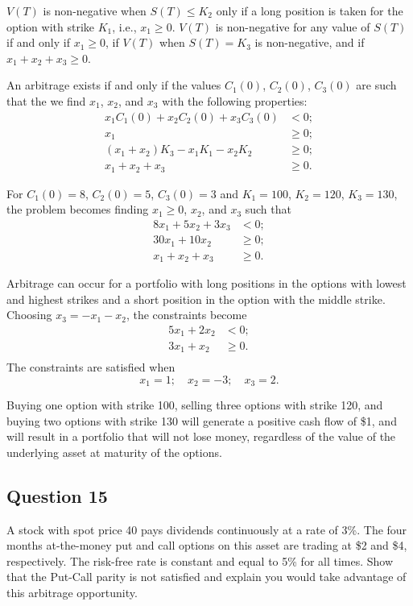$ V(T) $ is non-negative when $ S(T) \leq K_2 $ only if a long position is
    taken for the option with strike $ K_1 $, i.e., $ x_1 \geq 0 $.
$ V(T) $ is non-negative for any value of $ S(T) $ if and only if
    $ x_1 \geq 0 $, if $ V(T) $ when $ S(T) = K_3 $ is non-negative, and if
    $ x_1 + x_2 + x_3 \geq 0 $.

An arbitrage exists if and only if the values $ C_1(0) $, $ C_2(0) $,
    $ C_3(0) $ are such that the we find $ x_1 $, $ x_2 $, and $ x_3 $ with the
    following properties:
\begin{align*}
    x_1 C_1(0) + x_2 C_2(0) + x_3 C_3(0) &< 0; \\
    x_1 &\geq 0; \\
    (x_1 + x_2) K_3 - x_1 K_1 - x_2 K_2 &\geq 0; \\
    x_1 + x_2 + x_3 &\geq 0.
\end{align*}

For $ C_1(0) = 8 $, $ C_2(0) = 5 $, $ C_3(0) = 3 $ and $ K_1 = 100 $,
    $ K_2 = 120 $, $ K_3 = 130 $, the problem becomes finding $ x_1 \geq 0 $,
    $ x_2 $, and $ x_3 $ such that
\begin{align*}
    8 x_1 + 5 x_2 + 3 x_3 &< 0; \\
    30 x_1 + 10 x_2 &\geq 0; \\
    x_1 + x_2 + x_3 &\geq 0.
\end{align*}

Arbitrage can occur for a portfolio with long positions in the options with
    lowest and highest strikes and a short position in the option with the
    middle strike.
Choosing $ x_3 = -x_1 - x_2 $, the constraints become
\begin{align*}
    5 x_1 + 2 x_2 &< 0; \\
    3 x_1 + x_2 &\geq 0. \\
\end{align*}
The constraints are satisfied when
\begin{equation*}
    x_1 = 1; \quad x_2 = -3; \quad  x_3 = 2.
\end{equation*}

Buying one option with strike 100, selling three options with strike 120, and
    buying two options with strike 130 will generate a positive cash flow of
    \$1, and will result in a portfolio that will not lose money, regardless of
    the value of the underlying asset at maturity of the options.

\subsection{Question 15}
A stock with spot price 40 pays dividends continuously at a rate of 3\%.
The four months at-the-money put and call options on this asset are trading at
\$2 and \$4, respectively.
The risk-free rate is constant and equal to 5\% for all times.
Show that the Put-Call parity is not satisfied and explain you would take
    advantage of this arbitrage opportunity.

